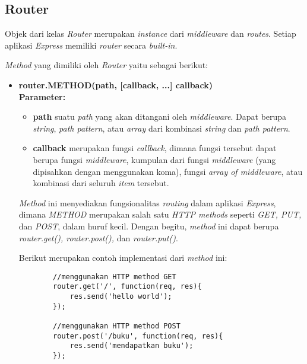 \subsection{Router}
Objek dari kelas \textit{Router} merupakan \textit{instance} dari \textit{middleware} dan \textit{routes}. Setiap aplikasi \textit{Express} memiliki \textit{router} secara \textit{built-in}. 

\textit{Method} yang dimiliki oleh \textit{Router} yaitu sebagai berikut:

\begin{itemize}
	\item \textbf{router.METHOD(path, [callback, ...] callback)} \\ \textbf{Parameter:} \\ 
	\begin{itemize}
		\item \textbf{path} suatu \textit{path} yang akan ditangani oleh \textit{middleware}. Dapat berupa \textit{string}, \textit{path pattern}, atau \textit{array} dari kombinasi \textit{string} dan \textit{path pattern}.
		
		\item \textbf{callback} merupakan fungsi \textit{callback}, dimana fungsi tersebut dapat berupa fungsi \textit{middleware}, kumpulan dari fungsi \textit{middleware} (yang dipisahkan dengan menggunakan koma), fungsi \textit{array of middleware}, atau kombinasi dari seluruh \textit{item} tersebut.
	\end{itemize}

	\textit{Method} ini menyediakan fungsionalitas \textit{routing} dalam aplikasi \textit{Express}, dimana \textit{METHOD} merupakan salah satu \textit{HTTP methods} seperti \textit{GET, PUT, } dan \textit{POST}, dalam huruf kecil. Dengan begitu, \textit{method} ini dapat berupa \textit{router.get(), router.post(),} dan \textit{router.put()}.
	
	Berikut merupakan contoh implementasi dari \textit{method} ini:
	\begin{lstlisting}
		//menggunakan HTTP method GET
		router.get('/', function(req, res){
			res.send('hello world');
		});
		
		//menggunakan HTTP method POST
		router.post('/buku', function(req, res){
			res.send('mendapatkan buku');
		});
	\end{lstlisting}
	
\end{itemize}


